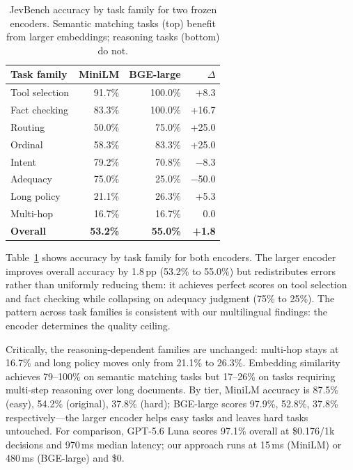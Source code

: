 \documentclass[11pt]{article}
\begin{document}
\begin{table}[t]
\centering
\caption{JevBench accuracy by task family for two frozen encoders. Semantic matching tasks (top) benefit from larger embeddings; reasoning tasks (bottom) do not.}
\label{tab:jevbench}
\small
\begin{tabular}{lrrr}
\toprule
Task family & MiniLM & BGE-large & $\Delta$ \\
\midrule
Tool selection & 91.7\% & 100.0\% & \textcolor{green!60!black}{+8.3} \\
Fact checking & 83.3\% & 100.0\% & \textcolor{green!60!black}{+16.7} \\
Routing & 50.0\% & 75.0\% & \textcolor{green!60!black}{+25.0} \\
Ordinal & 58.3\% & 83.3\% & \textcolor{green!60!black}{+25.0} \\
Intent & 79.2\% & 70.8\% & \textcolor{red!70!black}{$-$8.3} \\
Adequacy & 75.0\% & 25.0\% & \textcolor{red!70!black}{$-$50.0} \\
\midrule
Long policy & 21.1\% & 26.3\% & +5.3 \\
Multi-hop & 16.7\% & 16.7\% & 0.0 \\
\midrule
\textbf{Overall} & \textbf{53.2\%} & \textbf{55.0\%} & \textbf{+1.8} \\
\bottomrule
\end{tabular}
\end{table}

Table~\ref{tab:jevbench} shows accuracy by task family for both encoders. The larger encoder improves overall accuracy by 1.8\,pp (53.2\% to 55.0\%) but redistributes errors rather than uniformly reducing them: it achieves perfect scores on tool selection and fact checking while collapsing on adequacy judgment (75\% to 25\%). The pattern across task families is consistent with our multilingual findings: the encoder determines the quality ceiling.

Critically, the reasoning-dependent families are unchanged: multi-hop stays at 16.7\% and long policy moves only from 21.1\% to 26.3\%. Embedding similarity achieves 79--100\% on semantic matching tasks but 17--26\% on tasks requiring multi-step reasoning over long documents. By tier, MiniLM accuracy is 87.5\% (easy), 54.2\% (original), 37.8\% (hard); BGE-large scores 97.9\%, 52.8\%, 37.8\% respectively---the larger encoder helps easy tasks and leaves hard tasks untouched. For comparison, GPT-5.6 Luna scores 97.1\% overall at \$0.176/1k decisions and 970\,ms median latency; our approach runs at 15\,ms (MiniLM) or 480\,ms (BGE-large) and \$0.
\end{document}
